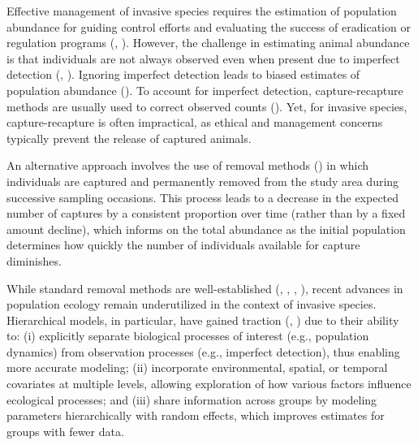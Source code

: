 \documentclass[
  11pt,
  a4paper,
]{article}
\begin{document}
Effective management of invasive species requires the estimation of population abundance for guiding control efforts and evaluating the success of eradication or regulation programs (, ). However, the challenge in estimating animal abundance is that individuals are not always observed even when present due to imperfect detection (, ). Ignoring imperfect detection leads to biased estimates of population abundance (). To account for imperfect detection, capture-recapture methods are usually used to correct observed counts (). Yet, for invasive species, capture-recapture is often impractical, as ethical and management concerns typically prevent the release of captured animals.

An alternative approach involves the use of removal methods () in which individuals are captured and permanently removed from the study area during successive sampling occasions. This process leads to a decrease in the expected number of captures by a consistent proportion over time (rather than by a fixed amount decline), which informs on the total abundance as the initial population determines how quickly the number of individuals available for capture diminishes.

While standard removal methods are well-established (, , , ), recent advances in population ecology remain underutilized in the context of invasive species. Hierarchical models, in particular, have gained traction (, ) due to their ability to: (i) explicitly separate biological processes of interest (e.g., population dynamics) from observation processes (e.g., imperfect detection), thus enabling more accurate modeling; (ii) incorporate environmental, spatial, or temporal covariates at multiple levels, allowing exploration of how various factors influence ecological processes; and (iii) share information across groups by modeling parameters hierarchically with random effects, which improves estimates for groups with fewer data.
\end{document}
